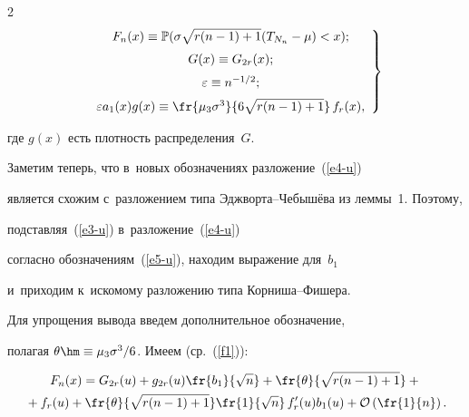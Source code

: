 \begin{multicols}{2}
\begin{equation}

\left.

\begin{array}{c}

 F_n(x)                     \equiv \mathbb{P}(\sigma\sqrt{r(n-1)+1}(T_{N_n}-\mu)<x);    \\[6pt]

 G(x)                       \equiv G_{2r}(x);                                           \\[6pt]

 \varepsilon                \equiv n^{-{1}/{2}};                                    \\[6pt]

 \varepsilon a_1(x) g(x)    \equiv \fr{\mu_3 \sigma^{3}}{6\sqrt{r(n-1)+1}}\,f_r(x),

\end{array}

\right\}

\label{e5-u}

\end{equation}

где $g(x)$ есть плотность распределения~$G$.

Заметим теперь, что в~новых обозначениях разложение~(\ref{e4-u}) 

является схожим с~разложением типа Эджворта--Че\-бы\-шё\-ва из леммы~1. Поэтому, 

подставляя~(\ref{e3-u}) в~разложение~(\ref{e4-u}) 

согласно обозначениям~(\ref{e5-u}),  находим выражение для~$b_1$ 

и~приходим  к~искомому разложению типа Корниша--Фишера. 



Для упрощения вывода введем дополнительное обозначение, 

полагая $\theta \hm\equiv \mu_3 \sigma^{3}/6$. Имеем (ср.~(\ref{f1})):

\begin{multline*}

F_n(x)

   = G_{2r}(u)+g_{2r}(u) \fr{b_1}{\sqrt{n}}+

   \fr{\theta}{\sqrt{r(n-1)+1}} +{}\\

   {}+ f_r(u) + \fr{\theta}{\sqrt{r(n-1)+1}} \fr{1}{\sqrt{n}}\, f_{r}'(u) b_1(u) + 

\mathcal{O}\left(\fr{1}{n}\right) .


\end{multline*}
\end{multicols}
